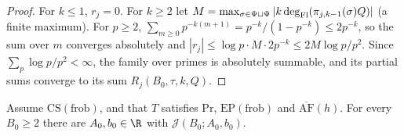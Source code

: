 \begin{proof}
For $k\le1$, $r_j=0$. For $k\ge2$ let $M=\max_{\sigma\in\Psi\sqcup\Psi}|k\deg_{\mathrm{Fl}}(\pi_{j,k-1}(\sigma)Q)|$ (a finite
maximum). For $p\ge2$, $\sum_{m\ge0}p^{-k(m+1)}=p^{-k}/(1-p^{-k})\le2p^{-k}$, so the sum over $m$ converges absolutely
and $|r_j|\le\log p\cdot M\cdot2p^{-k}\le2M\log p/p^2$. Since $\sum_p\log p/p^2<\infty$, the family over primes is
absolutely summable, and its partial sums converge to its sum $R_j(B_0,\tau,k,Q)$.
\end{proof}

\begin{proposition}\label{pf:volthm:prop:identat}
Assume $\mathrm{CS}(\mathrm{frob})$, and that $T$ satisfies $\mathrm{Pr}$,
$\mathrm{EP}(\mathrm{frob})$ and $\overline{\mathrm{AF}}(h)$. For every $B_0\ge2$ there are $A_0,b_0\in\R$ with
$\mathcal J(B_0;A_0,b_0)$.
\end{proposition}

